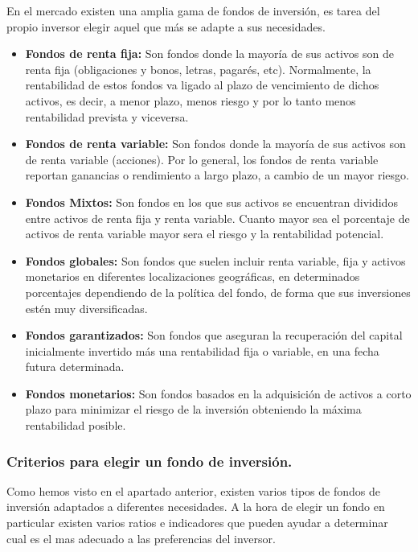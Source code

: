 \documentclass[12pt, a4paper]{article}
\begin{document}
En el mercado existen una amplia gama de fondos de inversión, es tarea del propio inversor elegir aquel que más se adapte a sus necesidades.

\begin{itemize}
	\item \textbf{Fondos de renta fija:} Son fondos donde la mayoría de sus activos son de renta fija (obligaciones y bonos, letras, pagarés, etc). Normalmente, la rentabilidad de estos fondos va ligado al plazo de vencimiento de dichos activos, es decir, a menor plazo, menos riesgo y por lo tanto menos rentabilidad prevista y viceversa.
	\item \textbf{Fondos de renta variable:} Son fondos donde la mayoría de sus activos son de renta variable (acciones). Por lo general, los fondos de renta variable reportan ganancias o rendimiento a largo plazo, a cambio de un mayor riesgo.
	\item \textbf{Fondos Mixtos:} Son fondos en los que sus activos se encuentran divididos entre activos de renta fija y renta variable. Cuanto mayor sea el porcentaje de activos de renta variable mayor sera el riesgo y la rentabilidad potencial.
	\item \textbf{Fondos globales:} Son fondos que suelen incluir renta variable, fija y activos monetarios en diferentes localizaciones geográficas, en determinados porcentajes dependiendo de la política del fondo, de forma que sus inversiones estén muy diversificadas.
	\item \textbf{Fondos garantizados:} Son fondos que aseguran la recuperación del capital inicialmente invertido más una rentabilidad fija o variable, en una fecha futura determinada.
	\item \textbf{Fondos monetarios:} Son fondos basados en la adquisición de activos a corto plazo para minimizar el riesgo de la inversión obteniendo la máxima rentabilidad posible.
\end{itemize}


\subsubsection{Criterios para elegir un fondo de inversión.}


Como hemos visto en el apartado anterior, existen varios tipos de fondos de inversión adaptados a diferentes necesidades. A la hora de elegir un fondo en particular existen varios ratios e indicadores que pueden ayudar a determinar cual es el mas adecuado a las preferencias del inversor.\\
\end{document}
